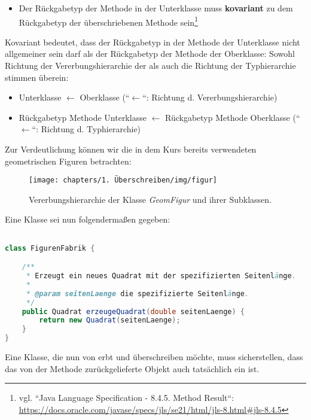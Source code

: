 \begin{itemize}
    \item Der Rückgabetyp der Methode in der Unterklasse muss \textbf{kovariant} zu dem Rückgabetyp der überschriebenen Methode sein\footnote{
        vgl. ``Java Language Specification - 8.4.5. Method Result``: \url{https://docs.oracle.com/javase/specs/jls/se21/html/jls-8.html#jls-8.4.5}
    }
\end{itemize}

Kovariant bedeutet, dass der Rückgabetyp in der Methode der Unterklasse nicht allgemeiner sein darf als der Rückgabetyp der Methode der Oberklasse:
Sowohl Richtung der Vererbungshierarchie der als auch die Richtung der Typhierarchie stimmen überein:

\begin{itemize}
    \item Unterklasse $\leftarrow$ Oberklasse (``$\leftarrow$``: Richtung d. Vererbungshierarchie)
    \item Rückgabetyp Methode Unterklasse $\leftarrow$ Rückgabetyp Methode Oberklasse (``$\leftarrow$``: Richtung d. Typhierarchie)
\end{itemize}

Zur Verdeutlichung können wir die in dem Kurs bereits verwendeten geometrischen Figuren betrachten:

\begin{figure}[h]
    \centering
    \texttt{[image: chapters/1. Überschreiben/img/figur]}
    \caption{Vererbungshierarchie der Klasse \textit{GeomFigur} und ihrer Subklassen.}
    \label{fig:figur}
\end{figure}

Eine Klasse  sei nun folgendermaßen gegeben:

\begin{lstlisting}[language=java]

class FigurenFabrik {

    /**
     * Erzeugt ein neues Quadrat mit der spezifizierten Seitenlänge.
     *
     * @param seitenLaenge die spezifizierte Seitenlänge.
     */
    public Quadrat erzeugeQuadrat(double seitenLaenge) {
        return new Quadrat(seitenLaenge);
    }
}
\end{lstlisting}

Eine Klasse, die nun von  erbt und  überschreiben möchte,
muss sicherstellen, dass das von der Methode zurückgelieferte Objekt auch tatsächlich ein  ist.

